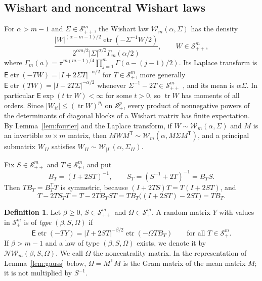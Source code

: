 \documentclass{amsart}
\theoremstyle{definition}
\newtheorem{definition}[theorem]{Definition}
\theoremstyle{remark}
\numberwithin{equation}{section}
\newcommand{\E}{\mathsf{E}}
\newcommand{\Sym}{\mathcal{S}}
\newcommand{\W}{\mathcal{W}}
\newcommand{\NW}{\mathcal{N}\!\mathcal{W}}
\newcommand{\tr}{\operatorname{tr}}
\newcommand{\etr}{\operatorname{etr}}
\begin{document}
\subsection{Wishart and noncentral Wishart laws}
For $\alpha>m-1$ and $\Sigma\in\Sym^m_{++}$, the Wishart law $\W_m(\alpha,\Sigma)$ has the density
\[
\frac{|W|^{(\alpha-m-1)/2}\etr(-\Sigma^{-1}W/2)}{2^{\alpha m/2}|\Sigma|^{\alpha/2}\Gamma_m(\alpha/2)},\qquad W\in\Sym^m_{++},
\]
where $\Gamma_m(a)=\pi^{m(m-1)/4}\prod_{j=1}^m\Gamma(a-(j-1)/2)$. Its Laplace transform is $\E\etr(-TW)=|I+2\Sigma T|^{-\alpha/2}$ for $T\in\Sym^m_+$, more generally $\E\etr(TW)=|I-2T\Sigma|^{-\alpha/2}$ whenever $\Sigma^{-1}-2T\in\Sym^m_{++}$ \cite[Theorem~3.2.3]{Mui82}, and its mean is $\alpha\Sigma$. In particular $\E\exp(t\tr W)<\infty$ for some $t>0$, so $\tr W$ has moments of all orders. Since $|W_{ii}|\le(\tr W)^{p_i}$ on $\Sym^p_+$, every product of nonnegative powers of the determinants of diagonal blocks of a Wishart matrix has finite expectation. By Lemma~\ref{lem:fourier} and the Laplace transform, if $W\sim\W_m(\alpha,\Sigma)$ and $M$ is an invertible $m\times m$ matrix, then $MWM^{\mathsf T}\sim\W_m(\alpha,M\Sigma M^{\mathsf T})$, and a principal submatrix $W_{II}$ satisfies $W_{II}\sim\W_{|I|}(\alpha,\Sigma_{II})$.

Fix $S\in\Sym^m_{++}$ and $T\in\Sym^m_+$, and put
\begin{equation}\label{eq:BST}
B_T=(I+2ST)^{-1},\qquad S_T=(S^{-1}+2T)^{-1}=B_TS.
\end{equation}
Then $TB_T=B_T^{\mathsf T}T$ is symmetric, because $(I+2TS)T=T(I+2ST)$, and
\begin{equation}\label{eq:resolvent}
T-2TS_TT=T-2TB_TST=TB_T\bigl((I+2ST)-2ST\bigr)=TB_T.
\end{equation}

\begin{definition}\label{def:type}
Let $\beta\ge0$, $S\in\Sym^m_{++}$ and $\Omega\in\Sym^m_+$. A random matrix $Y$ with values in $\Sym^m_+$ is of \emph{type} $(\beta,S,\Omega)$ if
\begin{equation}\label{eq:type}
\E\etr(-TY)=|I+2ST|^{-\beta/2}\etr(-\Omega TB_T)\qquad\text{for all }T\in\Sym^m_+.
\end{equation}
If $\beta>m-1$ and a law of type $(\beta,S,\Omega)$ exists, we denote it by $\NW_m(\beta,S,\Omega)$. We call $\Omega$ the noncentrality matrix. In the representation of Lemma~\ref{lem:gauss} below, $\Omega=M^{\mathsf T}M$ is the Gram matrix of the mean matrix $M$; it is not multiplied by $S^{-1}$.
\end{definition}
\end{document}
